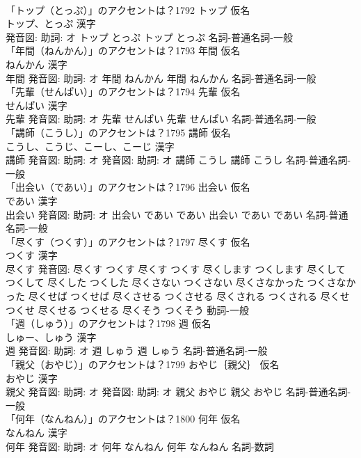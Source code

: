 \documentclass[8pt]{extreport}
\begin{document}
\begin{CJK}{UTF8}{min}
\\	「トップ（とっぷ）」のアクセントは？1792	トップ 仮名　
\\	トップ、とっぷ 漢字　
\\	発音図: 助詞: オ	トップ とっぷ		トップ とっぷ				名詞-普通名詞-一般 
\\	「年間（ねんかん）」のアクセントは？1793	年間 仮名　
\\	ねんかん 漢字　
\\	年間 発音図: 助詞: オ	年間 ねんかん		年間 ねんかん				名詞-普通名詞-一般 
\\	「先輩（せんぱい）」のアクセントは？1794	先輩 仮名　
\\	せんぱい 漢字　
\\	先輩 発音図: 助詞: オ	先輩 せんぱい		先輩 せんぱい				名詞-普通名詞-一般 
\\	「講師（こうし）」のアクセントは？1795	講師 仮名　
\\	こうし、こうじ、こーし、こーじ 漢字　
\\	講師 発音図: 助詞: オ 発音図: 助詞: オ	講師 こうし		講師 こうし				名詞-普通名詞-一般 
\\	「出会い（であい）」のアクセントは？1796	出会い 仮名　
\\	であい 漢字　
\\	出会い 発音図: 助詞: オ	出会い であい であい		出会い であい であい				名詞-普通名詞-一般 
\\	「尽くす（つくす）」のアクセントは？1797	尽くす 仮名　
\\	つくす 漢字　
\\	尽くす 発音図:	尽くす つくす		尽くす つくす 尽くします つくします 尽くして つくして 尽くした つくした 尽くさない つくさない 尽くさなかった つくさなかった 尽くせば つくせば 尽くさせる つくさせる 尽くされる つくされる 尽くせ つくせ 尽くせる つくせる 尽くそう つくそう				動詞-一般 
\\	「週（しゅう）」のアクセントは？1798	週 仮名　
\\	しゅー、しゅう 漢字　
\\	週 発音図: 助詞: オ	週 しゅう		週 しゅう				名詞-普通名詞-一般 
\\	「親父（おやじ）」のアクセントは？1799	おやじ｛親父｝ 仮名　
\\	おやじ 漢字　
\\	親父 発音図: 助詞: オ 発音図: 助詞: オ	親父 おやじ		親父 おやじ				名詞-普通名詞-一般 
\\	「何年（なんねん）」のアクセントは？1800	何年 仮名　
\\	なんねん 漢字　
\\	何年 発音図: 助詞: オ	何年 なんねん		何年 なんねん				名詞-数詞 

\end{CJK}
\end{document}
